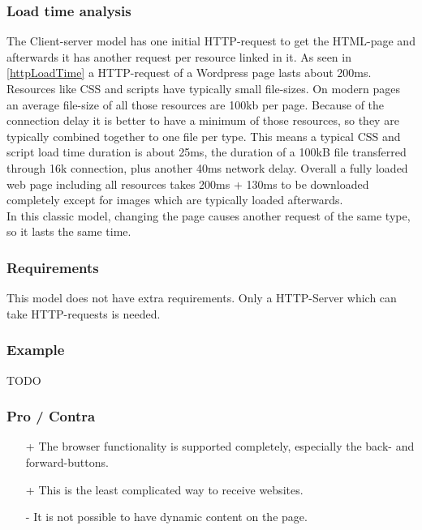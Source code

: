 \documentclass[f,bachelor,binding,twoside,palatino]{WeSTthesis}
\def \httpRequest {HTTP-request}
\def \httpRequests {HTTP-requests}
\begin{document}
    \subsubsection{Load time analysis}
      The Client-server model has one initial \httpRequest{} to get the HTML-page and afterwards it has another request per resource linked in it. 
      As seen in \ref{httpLoadTime} a \httpRequest{} of a Wordpress page lasts about 200ms.
      Resources like CSS and scripts have typically small file-sizes. On modern pages an average file-size of all those resources are 100kb per page. 
      Because of the connection delay it is better to have a minimum of those resources, so they are typically combined together to one file per type.
      This means a typical CSS and script load time duration is about 25ms, the duration of a 100kB file transferred through 16k connection, plus another 40ms network delay.
      Overall a fully loaded web page including all resources takes 200ms + 130ms to be downloaded completely except for images which are typically loaded afterwards.\\
      In this classic model, changing the page causes another request of the same type, so it lasts the same time.
    
    \subsubsection{Requirements}
    This model does not have extra requirements. Only a HTTP-Server which can take \httpRequests{} is needed.

    \subsubsection{Example}
    TODO
      
    \subsubsection{Pro / Contra}
      \begin{itemize}
  	    \item[+]{The browser functionality is supported completely, especially the back- and forward-buttons.}
  	    \item[+]{This is the least complicated way to receive websites.}
        \item[-]{It is not possible to have dynamic content on the page.}
      \end{itemize}
\end{document}

